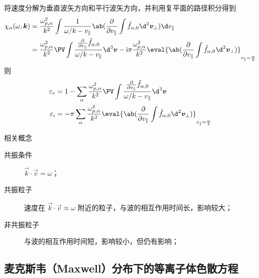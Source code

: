将速度分解为垂直波矢方向和平行波矢方向，并利用复平面的路径积分得到
\begin{equation}\begin{aligned}
\chi_\alpha(\omega, \vec{k})
&= \frac{\omega_{p,\alpha}^2}{k^2} \int
    \frac{1}{\omega / k - v_\parallel}
    \ab( \pdv{}{v_\parallel}
        \int \hat{f}_{\alpha,0} \d^2 \vec{v}_\perp
    )
\d v_\parallel \\
&= \frac{\omega_{p,\alpha}^2}{k^2} \PV\int
    \frac{\pdv{}{v_\parallel} \hat{f}_{\alpha,0}}{\omega / k - v_\parallel}
\d^3 \vec{v}
- \im \pi \frac{\omega_{p,\alpha}^2}{k^2}
    \eval{\ab(\pdv{}{v_\parallel}
        \int \hat{f}_{\alpha,0} \d^2 \vec{v}_\perp
    )}_{v_\parallel = \frac{\omega}{k}}
\end{aligned}\end{equation}
则
\begin{subequations}\begin{align}
\varepsilon_r &= 1 - \sum_\alpha \frac{\omega_{p,\alpha}^2}{k^2} \PV \int
    \frac{\pdv{}{v_\parallel} \hat{f}_{\alpha,0}}{\omega / k - v_\parallel}
\d^3 \vec{v} \\
\varepsilon_i &= - \pi \sum_\alpha \frac{\omega_{p,\alpha}^2}{k^2}
    \eval{\ab(\pdv{}{v_\parallel}
        \int \hat{f}_{\alpha,0} \d^2 \vec{v}_\perp
    )}_{v_\parallel = \frac{\omega}{k}}
\end{align}\end{subequations}

相关概念
\begin{description}
    \item[共振条件] $\vec{k} \cdot \vec{v} = \omega$；
    \item[共振粒子] 速度在 $\vec{k} \cdot \vec{v} \approx \omega$ 附近的粒子，与波的相互作用时间长，影响较大；
    \item[非共振粒子] 与波的相互作用时间短，影响较小，但仍有影响；
\end{description}

\subsection{麦克斯韦（Maxwell）分布下的等离子体色散方程}

